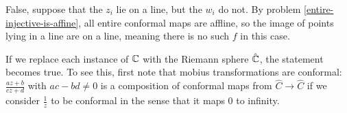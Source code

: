 \documentclass{homework}
\begin{document}
                                                                                                                                                                                                \begin{solution}
                                                                                                                                                                                                False, suppose that the $z_i$ lie on a line, but the $w_i$ do not. By problem \ref{entire-injective-is-affine}, all entire conformal maps are affline, so the image of points lying in a line are on a line, meaning there is no such $f$ in this case. 

                                                                                                                                                                                                If we replace each instance of $\mathbb{C}$ with the Riemann sphere $\hat{\mathbb{C}}$, the statement becomes true. To see this, first note that mobius transformations are conformal: $\frac{az+b}{cz+d}$ with $ac-bd\neq 0$ is a composition of conformal maps from $\hat{C} \to \hat{C}$ if we consider $\frac{1}{z}$ to be conformal in the sense that it maps 0 to infinity.


\end{solution}
\end{document}

